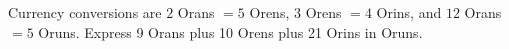 Currency conversions are $2$ Orans $=5$ Orens, $3$ Orens $=4$ Orins, and $12$ Orans $=5$ Oruns. Express 9 Orans plus 10 Orens plus 21 Orins in Oruns.
